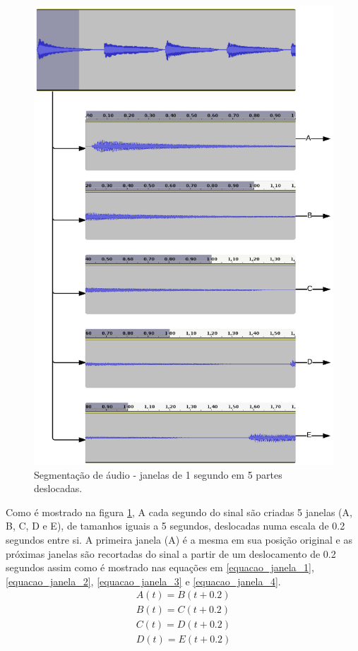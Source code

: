 \begin{figure}[h] 
  \centering
    \includegraphics[keepaspectratio=true, scale=0.7]{figuras/procedimento_1}
    \caption{Segmentação de áudio - janelas de 1 segundo em 5 partes deslocadas.}
    \label{fig:procedimento_1}
\end{figure}

Como é mostrado na figura \ref{fig:procedimento_1}, A cada segundo do sinal são criadas 5 janelas (A, B, C, D e E), de tamanhos iguais a 5 segundos, deslocadas numa escala de 0.2 segundos entre si. A primeira janela (A) é a mesma em sua posição original e as próximas janelas são recortadas do sinal a partir de um deslocamento de 0.2 segundos assim como é mostrado nas equações em \ref{equacao_janela_1}, \ref{equacao_janela_2}, \ref{equacao_janela_3} e \ref{equacao_janela_4}.
\begin{eqnarray}
\label{equacao_janela_1}
	A(t) = B(t + 0.2) \\
	\label{equacao_janela_2}
	B(t) = C(t + 0.2) \\
	\label{equacao_janela_3}
	C(t) = D(t + 0.2) \\
	\label{equacao_janela_4}
	D(t) = E(t + 0.2)
\end{eqnarray}

